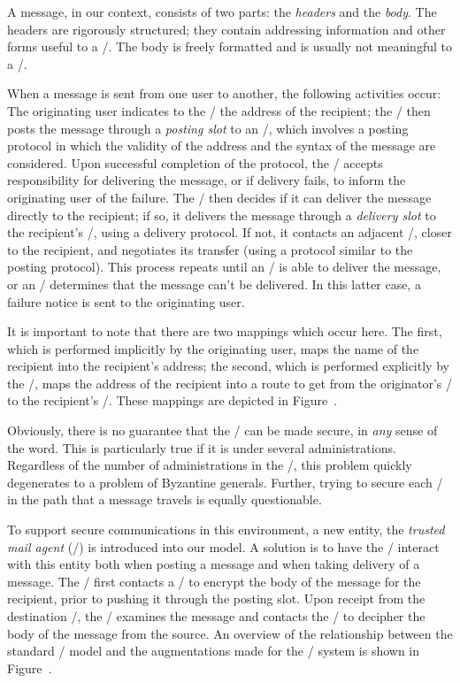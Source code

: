A message, in our context, consists of two parts:
the {\it headers} and the {\it body}.
The headers are rigorously structured;
they contain addressing information and other forms useful to a \UA/.
The body is freely formatted and is usually not meaningful to a \UA/.

When a message is sent from one user to another,
the following activities occur:
The originating user indicates to the \UA/ the address of the recipient;
the \UA/ then posts the message through a {\it posting slot} to an \MTA/,
which involves a posting protocol in which the validity of the address
and the syntax of the message are considered.
Upon successful completion of the protocol,
the \MTA/ accepts responsibility for delivering the message,
or if delivery fails, to inform the originating user of the failure.
The \MTA/ then decides if it can deliver the message directly to the
recipient;
if so, it delivers the message through a {\it delivery slot} to the
recipient's \UA/,
using a delivery protocol.
If not, it contacts an adjacent \MTA/, closer to the recipient,
and negotiates its transfer (using a protocol similar to the posting protocol).
This process repeats until an \MTA/ is able to deliver the message,
or an \MTA/ determines that the message can't be delivered.
In this latter case,
a failure notice is sent to the originating user.

It is important to note that there are two mappings which occur here.
The first, which is performed implicitly by the originating user,
maps the name of the recipient into the recipient's address;
the second, which is performed explicitly by the \MTS/,
maps the address of the recipient into a route to get from the originator's
\MTA/ to the recipient's \MTA/.
These mappings are depicted in Figure~\mappings.

Obviously, there is no guarantee that the \MTS/ can be made secure,
in {\it any} sense of the word.
This is particularly true if it is under several administrations.
Regardless of the number of administrations in the \MTS/,
this problem quickly degenerates to a problem of
Byzantine generals\cite{LLamp82}.
Further, trying to secure each \MTA/ in the path that a message travels is
equally questionable.

To support secure communications in this environment,
a new entity,
the {\it trusted mail agent} (\TMA/) is introduced into our model.
A solution is to have the \UA/ interact with this entity
both when posting a message and when taking delivery of a message.
The \UA/ first contacts a \TMA/ to encrypt the body of the message for the
recipient,
prior to pushing it through the posting slot.
Upon receipt from the destination \MTA/,
the \UA/ examines the message and contacts
the \TMA/ to decipher the body of the message from the source.
An overview of the relationship between the standard \MTS/ model
and the augmentations made for the \trustedmail/ system is shown in
Figure~\tmodel.

